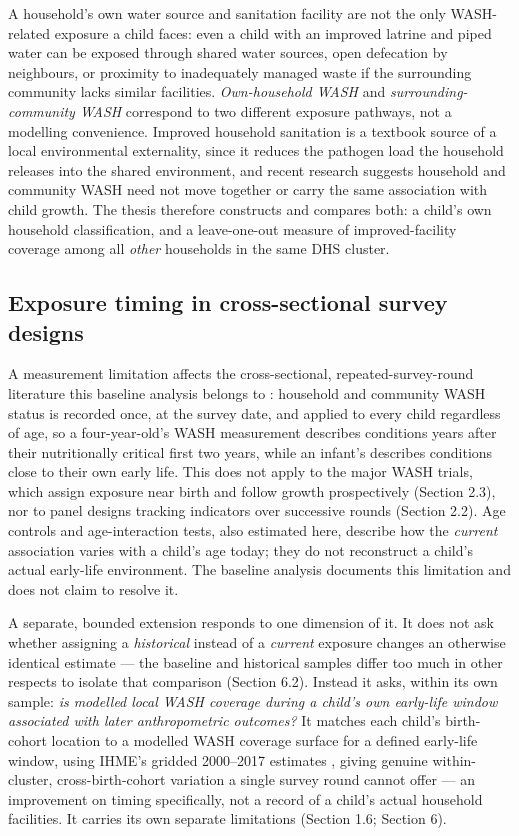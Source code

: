 A household's own water source and sanitation facility are not the only WASH-related exposure a child faces: even a child with an improved latrine and piped water can be exposed through shared water sources, open defecation by neighbours, or proximity to inadequately managed waste if the surrounding community lacks similar facilities. \emph{Own-household WASH} and \emph{surrounding-community WASH} correspond to two different exposure pathways, not a modelling convenience. Improved household sanitation is a textbook source of a local environmental externality, since it reduces the pathogen load the household releases into the shared environment, and recent research \autocite{Donohue2023,SkoufiasVinha2026} suggests household and community WASH need not move together or carry the same association with child growth. The thesis therefore constructs and compares both: a child's own household classification, and a leave-one-out measure of improved-facility coverage among all \emph{other} households in the same DHS cluster.

\subsection{Exposure timing in cross-sectional survey designs}\label{sec:1.2}

A measurement limitation affects the cross-sectional, repeated-survey-round literature this baseline analysis belongs to \autocite{Rakotomanana2020,Addae2024}: household and community WASH status is recorded once, at the survey date, and applied to every child regardless of age, so a four-year-old's WASH measurement describes conditions years after their nutritionally critical first two years, while an infant's describes conditions close to their own early life. This does not apply to the major WASH trials, which assign exposure near birth and follow growth prospectively (Section 2.3), nor to panel designs tracking indicators over successive rounds (Section 2.2). Age controls and age-interaction tests, also estimated here, describe how the \emph{current} association varies with a child's age today; they do not reconstruct a child's actual early-life environment. The baseline analysis documents this limitation and does not claim to resolve it.

A separate, bounded extension responds to one dimension of it. It does not ask whether assigning a \emph{historical} instead of a \emph{current} exposure changes an otherwise identical estimate --- the baseline and historical samples differ too much in other respects to isolate that comparison (Section 6.2). Instead it asks, within its own sample: \emph{is modelled local WASH coverage during a child's own early-life window associated with later anthropometric outcomes?} It matches each child's birth-cohort location to a modelled WASH coverage surface for a defined early-life window, using IHME's gridded 2000--2017 estimates \autocite{LBDWaSH2020}, giving genuine within-cluster, cross-birth-cohort variation a single survey round cannot offer --- an improvement on timing specifically, not a record of a child's actual household facilities. It carries its own separate limitations (Section 1.6; Section 6).

